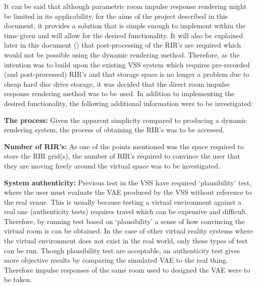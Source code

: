 \documentclass[../../main.tex]{subfiles}
\begin{document}
		It can be said that although parametric room impulse response rendering might be limited in its applicability, for the aims of the project described in this document, it provides a solution that is simple enough to implement within the time given and will allow for the desired functionality. It will also be explained later in this document () that post-processing of the \ac{RIR}'s are required which would not be possible using the dynamic rendering method. Therefore, as the intention was to build upon the existing \ac{VSS} system which requires pre-recorded (and post-processed) \ac{RIR}'s and that storage space is no longer a problem due to cheap hard disc drive storage, it was decided that the direct room impulse response rendering method was to be used. In addition to implementing the desired functionality, the following additional information were to be investigated:

		
			\textbf{The process:} Given the apparent simplicity compared to producing a dynamic rendering system, the process of obtaining the \ac{RIR}'s was to be accessed.

			\textbf{Number of \ac{RIR}'s:} As one of the points mentioned was the space required to store the \ac{RIR} grid(s), the number of \ac{RIR}'s required to convince the user that they are moving freely around the virtual space was to be investigated.

			\textbf{System authenticity:} Previous test in the VSS have required ‘plausibility’ test, where the user must evaluate the \ac{VAE} produced by the VSS without reference to the real venue. This is usually because testing a virtual environment against a real one (authenticity tests) requires travel which can be expensive and difficult. Therefore, by running test based on ‘plausibility’ a sense of how convincing the virtual room is can be obtained. In the case of other virtual reality systems where the virtual environment does not exist in the real world, only these types of test can be run. Though plausibility test are acceptable, an authenticity test gives more objective results by comparing the simulated \ac{VAE} to the real thing. Therefore impulse responses of the same room used to designed the \ac{VAE} were to be taken.

\end{document}
